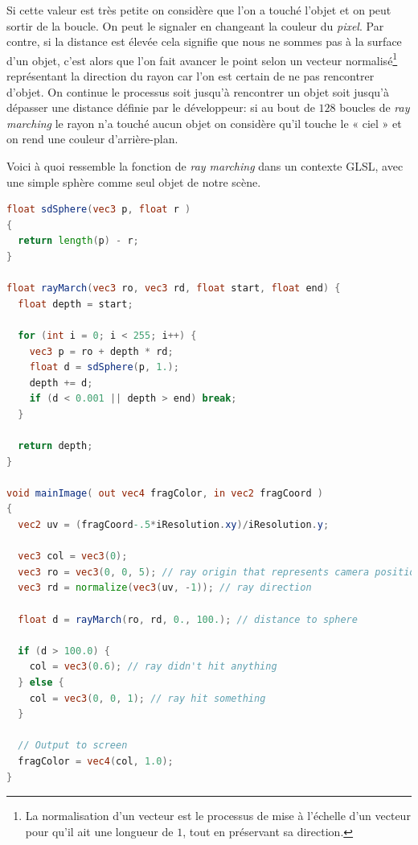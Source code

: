 Si cette valeur est très petite on considère que l'on a touché l'objet et on peut sortir de la boucle. On peut le signaler en changeant la couleur du \textit{pixel}. Par contre, si la distance est élevée cela signifie que nous ne sommes pas à la surface d'un objet, c'est alors que l'on fait avancer le point selon un vecteur normalisé\footnote{La normalisation d'un vecteur est le processus de mise à l'échelle d'un vecteur pour qu'il ait une longueur de $1$, tout en préservant sa direction.} représentant la direction du rayon car l'on est certain de ne pas rencontrer d'objet. On continue le processus soit jusqu'à rencontrer un objet soit jusqu'à dépasser une distance définie par le développeur: si au bout de $128$ boucles de  \textit{ray marching} le rayon n'a touché aucun objet on considère qu'il touche le « ciel » et on rend une couleur d'arrière-plan.



Voici à quoi ressemble la fonction de \textit{ray marching} dans un contexte GLSL, avec une simple sphère comme seul objet de notre scène.

\begin{minipage}{\linewidth}
\begin{lstlisting}[language=GLSL, caption=Ray marching,captionpos=b,frame=single]
float sdSphere(vec3 p, float r )
{
  return length(p) - r;
}

float rayMarch(vec3 ro, vec3 rd, float start, float end) {
  float depth = start;

  for (int i = 0; i < 255; i++) {
    vec3 p = ro + depth * rd;
    float d = sdSphere(p, 1.);
    depth += d;
    if (d < 0.001 || depth > end) break;
  }

  return depth;
}

void mainImage( out vec4 fragColor, in vec2 fragCoord )
{
  vec2 uv = (fragCoord-.5*iResolution.xy)/iResolution.y;

  vec3 col = vec3(0);
  vec3 ro = vec3(0, 0, 5); // ray origin that represents camera position
  vec3 rd = normalize(vec3(uv, -1)); // ray direction

  float d = rayMarch(ro, rd, 0., 100.); // distance to sphere

  if (d > 100.0) {
    col = vec3(0.6); // ray didn't hit anything
  } else {
    col = vec3(0, 0, 1); // ray hit something
  }

  // Output to screen
  fragColor = vec4(col, 1.0);
}
\end{lstlisting}
\end{minipage}

